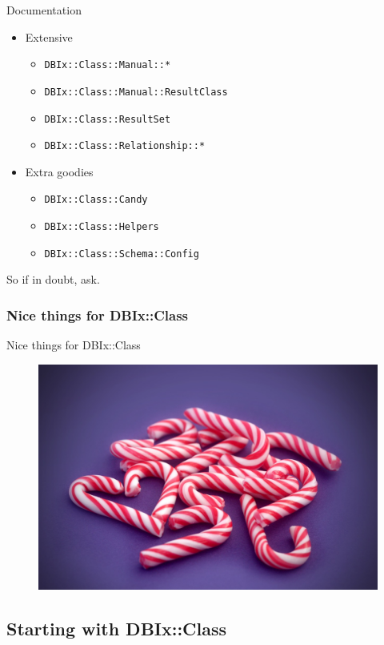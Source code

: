 \begin{frame}[fragile]{Documentation}
\begin{itemize}
\item Extensive
\begin{itemize}
\item \verb|DBIx::Class::Manual::*|
\item \verb|DBIx::Class::Manual::ResultClass|
\item \verb|DBIx::Class::ResultSet|
\item \verb|DBIx::Class::Relationship::*|
\end{itemize}
\item Extra goodies
\begin{itemize}
\item \verb|DBIx::Class::Candy|
\item \verb|DBIx::Class::Helpers|
\item \verb|DBIx::Class::Schema::Config|
\end{itemize}
\end{itemize}

So if in doubt,  ask.
\end{frame}

\subsubsection{Nice things for DBIx::Class}

\begin{frame}{Nice things for DBIx::Class}
\begin{figure}[!ht]
\centering
\includegraphics[width=0.8\linewidth]{img/candy-cane.jpg}
\end{figure}
\end{frame}

\subsection{Starting with DBIx::Class}

